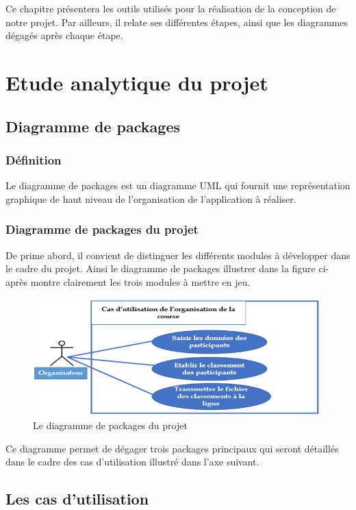\documentclass[12pt,a4paper]{report}
\begin{document}
Ce chapitre présentera les outils utilisés pour la réalisation de la conception de notre projet. Par ailleurs, il relate ses différentes étapes, ainsi que les diagrammes dégagés après chaque étape.
\section {Etude analytique du projet}


\subsection {Diagramme de packages }
\subsubsection{Définition}
Le diagramme de packages est un diagramme UML qui fournit une représentation graphique de haut niveau de l'organisation de l’application à réaliser.
\subsubsection{Diagramme de packages du projet}
De prime abord, il convient de distinguer les différents modules à développer dans le cadre du projet. Ainsi le diagramme de packages illustrer dans la figure ci-après montre clairement les trois modules à mettre en jeu.
\begin{figure}
	   \center
	   \includegraphics[scale=0.5]{Diagramme_de_packages.png}
	   \caption {Le diagramme de packages du projet}
\end{figure}

Ce diagramme permet de dégager trois packages principaux qui seront détaillés dans le cadre des cas d’utilisation illustré dans l’axe suivant.



\subsection {Les cas d’utilisation  }
\end{document}
